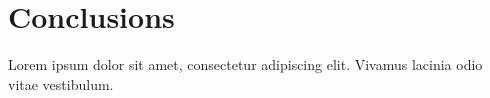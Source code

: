 \documentclass{article}
\begin{document}
\section{Conclusions}
Lorem ipsum dolor sit amet, consectetur adipiscing elit. Vivamus lacinia odio vitae vestibulum.

\lipsum[1]
\end{document}

